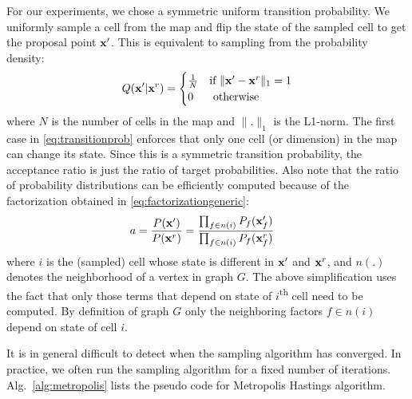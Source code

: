 \documentclass[letterpaper, 10 pt, conference]{ieeeconf} %
\begin{document}
For our experiments, we chose a symmetric uniform transition 
probability.  We uniformly sample a cell from the map and flip the state of the
sampled cell to get the proposal point $\mathbf{x}'$. This is equivalent to sampling
from the probability density:
\begin{align}
  Q(\mathbf{x}'| \mathbf{x}^r) = \begin{cases}
    \frac{1}{N} & \text{if $\|\mathbf{x}' - \mathbf{x}^r\|_1 = 1$}\\
      0 & \text{ otherwise}
  \end{cases}
  \label{eq:transitionprob}
\end{align}
where $N$ is the number of cells in the map and $\|.\|_1$ is the L1-norm. The
first case in \eqref{eq:transitionprob} enforces that only one cell (or dimension)
in the map can change its state. Since this is a symmetric transition
probability, the acceptance ratio is just the ratio of target probabilities.
Also note that the ratio of probability distributions can be efficiently
computed because of the factorization obtained in
\eqref{eq:factorizationgeneric}:
\begin{align}
  a &= \frac{P(\mathbf{x}')}{P(\mathbf{x}^r)}
    = \frac{\prod_{f \in n(i)} P_f(\mathbf{x}'_f)}{\prod_{f \in n(i)} P_f(\mathbf{x}^r_f)}
  \label{eq:acceptanceprob}
\end{align}
where $i$ is the (sampled) cell whose state is different in $\mathbf{x}'$ and $\mathbf{x}^r$,
and $n(.)$ denotes the neighborhood of a vertex in graph $G$.  
The above simplification uses the fact that only those terms  that depend on
state of $i$\textsuperscript{th} cell need to be computed. By definition
of graph $G$ only the neighboring factors $f \in n(i)$ depend on state of cell $i$.

It is in general difficult to detect when the sampling algorithm has converged.
In practice, we often run the sampling algorithm for a fixed number of
iterations. Alg.~\ref{alg:metropolis} lists the pseudo code for Metropolis
Hastings algorithm.

\end{document}
